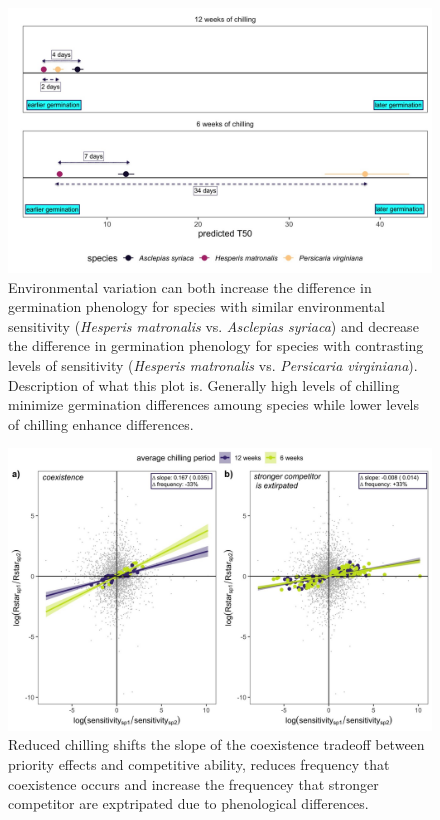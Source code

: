 \documentclass{article}[12pt]
\begin{document}
\begin{enumerate}
\begin{figure}[h!]
  \centering
 \includegraphics[width=\textwidth]{..//plots/sps_case_examps.jpeg}
    \caption{Environmental variation can both increase the difference in germination phenology for species with similar environmental sensitivity (\emph{Hesperis matronalis} vs. \emph{Asclepias syriaca}) and decrease the difference in germination phenology for species with contrasting levels of sensitivity (\emph{Hesperis matronalis} vs. \emph{Persicaria virginiana}). Description of what this plot is. Generally high levels of chilling minimize germination differences amoung species while lower levels of chilling enhance differences.}
    \label{Fig:case}
\end{figure}


\begin{figure}[h!]
  \centering
 \includegraphics[width=\textwidth]{..//plots/coexistance_runner.jpeg}
    \caption{Reduced chilling shifts the slope of the coexistence tradeoff between priority effects and competitive ability, reduces frequency that coexistence occurs and increase the frequencey that stronger competitor are exptripated due to phenological differences.}
    \label{Fig:coexistence}
\end{figure}



\end{enumerate}
\end{document}

